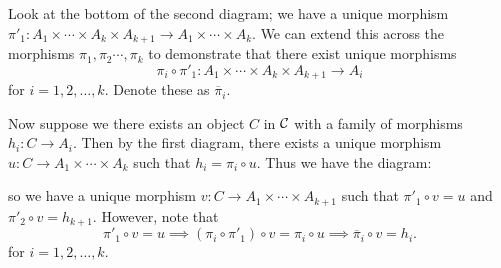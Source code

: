 \begin{prf}
\begin{description}
        Look at the bottom of the second diagram; we have a unique
        morphism $\pi'_1: A_1 \times \cdots \times A_k \times A_{k+1}
        \to A_1 \times \cdots \times A_k$.
        We can extend this across the morphisms $\pi_1, \pi_2 \cdots,
        \pi_k$ to demonstrate that there exist unique morphisms 
        \[
            \pi_i \circ \pi'_1: A_1 \times \cdots \times A_k \times A_{k+1}
            \to 
            A_i
        \]
        for $i = 1, 2, \dots, k$. Denote these as $\overline{\pi}_i$.
    
        Now suppose we there exists an object $C$ in $\mathcal{C}$ with a
        family of morphisms $h_i: C \to A_i$. Then by the first
        diagram, there exists a unique morphism $u: C \to A_1 \times \cdots
        \times A_k$ such that $h_i = \pi_i \circ u$. Thus we have the
        diagram:
        \begin{center}
        \end{center}    
        so we have a unique morphism $v: C \to A_1 \times \cdots
        \times A_{k+1}$ such that $\pi'_1 \circ v = u$ and $\pi'_2
        \circ v = h_{k+1}$. 
        However, note that 
        \[
            \pi'_1 \circ  v = u \implies (\pi_i \circ \pi'_1) \circ v = 
            \pi_i \circ u 
            \implies \overline{\pi}_i \circ v= h_i.
        \]
        for $i = 1, 2, \dots, k$. 
        

\end{description}
\end{prf}
